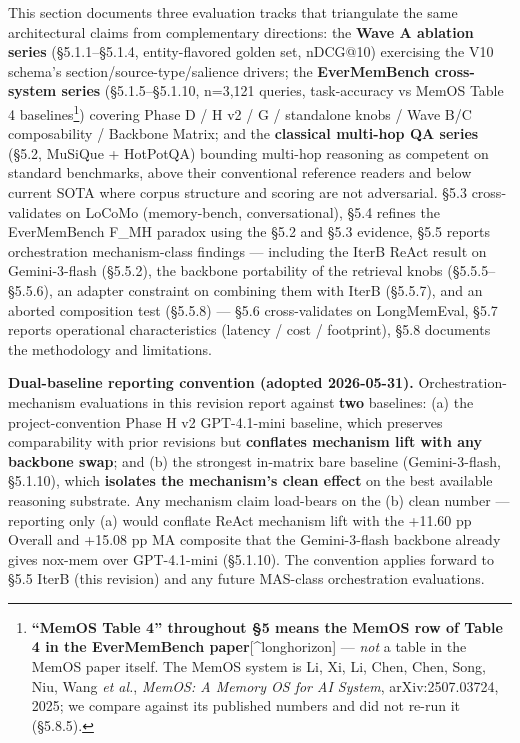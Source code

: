 \documentclass[
]{article}
\begin{document}
This section documents three evaluation tracks that triangulate the same
architectural claims from complementary directions: the \textbf{Wave A
ablation series} (§5.1.1--§5.1.4, entity-flavored golden set, nDCG@10)
exercising the V10 schema's section/source-type/salience drivers; the
\textbf{EverMemBench cross-system series} (§5.1.5--§5.1.10, n=3,121
queries, task-accuracy vs MemOS Table 4 baselines\footnote{\textbf{``MemOS
  Table 4'' throughout §5 means the MemOS row of Table 4 in the
  EverMemBench paper}{[}\^{}longhorizon{]} --- \emph{not} a table in the
  MemOS paper itself. The MemOS system is Li, Xi, Li, Chen, Chen, Song,
  Niu, Wang \emph{et al.}, \emph{MemOS: A Memory OS for AI System},
  arXiv:2507.03724, 2025; we compare against its published numbers and
  did not re-run it (§5.8.5).}) covering Phase D / H v2 / G / standalone
knobs / Wave B/C composability / Backbone Matrix; and the
\textbf{classical multi-hop QA series} (§5.2, MuSiQue + HotPotQA)
bounding multi-hop reasoning as competent on standard benchmarks, above
their conventional reference readers and below current SOTA where corpus
structure and scoring are not adversarial. §5.3 cross-validates on
LoCoMo (memory-bench, conversational), §5.4 refines the EverMemBench
F\_MH paradox using the §5.2 and §5.3 evidence, §5.5 reports
orchestration mechanism-class findings --- including the IterB ReAct
result on Gemini-3-flash (§5.5.2), the backbone portability of the
retrieval knobs (§5.5.5--§5.5.6), an adapter constraint on combining
them with IterB (§5.5.7), and an aborted composition test (§5.5.8) ---
§5.6 cross-validates on LongMemEval, §5.7 reports operational
characteristics (latency / cost / footprint), §5.8 documents the
methodology and limitations.

\textbf{Dual-baseline reporting convention (adopted 2026-05-31).}
Orchestration-mechanism evaluations in this revision report against
\textbf{two} baselines: (a) the project-convention Phase H v2
GPT-4.1-mini baseline, which preserves comparability with prior
revisions but \textbf{conflates mechanism lift with any backbone swap};
and (b) the strongest in-matrix bare baseline (Gemini-3-flash, §5.1.10),
which \textbf{isolates the mechanism's clean effect} on the best
available reasoning substrate. Any mechanism claim load-bears on the (b)
clean number --- reporting only (a) would conflate ReAct mechanism lift
with the +11.60 pp Overall and +15.08 pp MA composite that the
Gemini-3-flash backbone already gives nox-mem over GPT-4.1-mini
(§5.1.10). The convention applies forward to §5.5 IterB (this revision)
and any future MAS-class orchestration evaluations.
\end{document}

